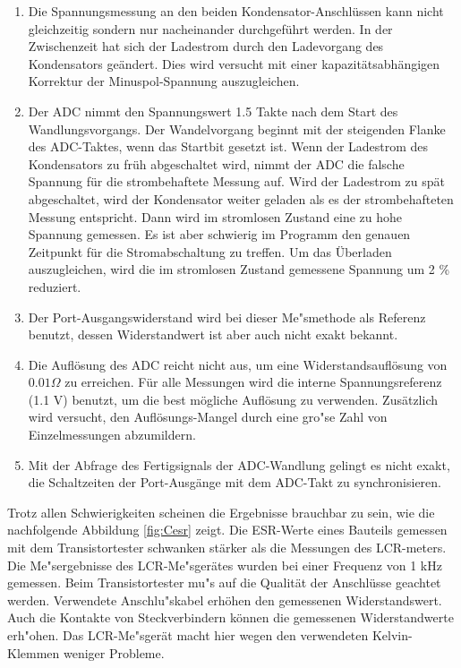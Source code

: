 \begin{enumerate}
\item Die Spannungsmessung an den beiden Kondensator-Anschl\"ussen kann nicht gleichzeitig sondern nur nacheinander durchgef\"uhrt werden.
 In der Zwischenzeit hat sich der Ladestrom durch den Ladevorgang des Kondensators ge\"andert.
Dies wird versucht mit einer kapazit\"atsabh\"angigen Korrektur der Minuspol-Spannung auszugleichen.
\item Der ADC nimmt den Spannungswert 1.5 Takte nach dem Start des Wandlungsvorgangs. Der Wandelvorgang beginnt mit
der steigenden Flanke des ADC-Taktes, wenn das Startbit gesetzt ist. Wenn der Ladestrom des Kondensators zu fr\"uh abgeschaltet wird,
nimmt der ADC die falsche Spannung f\"ur die strombehaftete Messung auf. Wird der Ladestrom zu sp\"at abgeschaltet, wird
der Kondensator weiter geladen als es der strombehafteten Messung entspricht.
Dann wird im stromlosen Zustand eine zu hohe Spannung gemessen.
Es ist aber schwierig im Programm den genauen Zeitpunkt f\"ur die Stromabschaltung zu treffen.
Um das \"Uberladen auszugleichen, wird die im stromlosen Zustand gemessene Spannung um 2 \% reduziert.
\item Der Port-Ausgangswiderstand wird bei dieser Me"smethode als Referenz benutzt, dessen Widerstandwert
ist aber auch nicht exakt bekannt.
\item Die Aufl\"osung des ADC reicht nicht aus, um eine Widerstandsaufl\"osung von \(0.01 \Omega\) zu erreichen.
F\"ur alle Messungen wird die interne Spannungsreferenz (1.1 V) benutzt, um die best m\"ogliche Aufl\"osung zu verwenden.
Zus\"atzlich wird versucht, den Aufl\"osungs-Mangel durch eine gro"se Zahl von Einzelmessungen abzumildern.
\item Mit der Abfrage des Fertigsignals der ADC-Wandlung gelingt es nicht exakt, die Schaltzeiten der Port-Ausg\"ange mit dem
ADC-Takt zu synchronisieren.
\end{enumerate}

Trotz allen Schwierigkeiten scheinen die Ergebnisse brauchbar zu sein, wie die nachfolgende Abbildung \ref{fig:Cesr} zeigt.
Die ESR-Werte eines Bauteils gemessen mit dem Transistortester schwanken st\"arker als die Messungen des LCR-meters.
Die Me"sergebnisse des LCR-Me"sger\"ates wurden bei einer Frequenz von 1 kHz gemessen.
Beim Transistortester mu"s auf die Qualit\"at der Anschl\"usse geachtet werden. Verwendete Anschlu"skabel
erh\"ohen den gemessenen Widerstandswert. Auch die Kontakte von Steckverbindern k\"onnen die gemessenen
Widerstandwerte erh"ohen. Das LCR-Me"sger\"at macht hier wegen den verwendeten Kelvin-Klemmen weniger Probleme.

